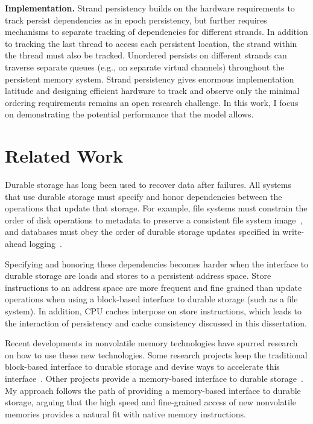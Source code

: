 \textbf{Implementation.}
Strand persistency builds on the hardware requirements to track persist dependencies as in epoch persistency, but further requires mechanisms to separate tracking of dependencies for different strands.
In addition to tracking the last thread to access each persistent location, the strand within the thread must also be tracked.
Unordered persists on different strands can traverse separate queues (e.g., on separate virtual channels) throughout the persistent memory system.
Strand persistency gives enormous implementation latitude and designing efficient hardware to track and observe only the minimal ordering requirements remains an open research challenge.
In this work, I focus on demonstrating the potential performance that the model allows.

\section{Related Work}
\label{sec:PersistencyModels:RelatedWork}

Durable storage has long been used to recover data after failures.
All systems that use durable storage must specify and honor dependencies between the operations that update that storage.
For example, file systems must constrain the order of disk operations to metadata to preserve a consistent file system image~\cite{Ganger00,Chidambaram13}, and databases must obey the order of durable storage updates specified in write-ahead logging~\cite{MohanHaderle92}.

Specifying and honoring these dependencies becomes harder when the interface to durable storage are loads and stores to a persistent address space.
Store instructions to an address space are more frequent and fine grained than update operations when using a block-based interface to durable storage (such as a file system).
In addition, CPU caches interpose on store instructions, which leads to the interaction of persistency and cache consistency discussed in this dissertation.

Recent developments in nonvolatile memory technologies have spurred research on how to use these new technologies.
Some research projects keep the traditional block-based interface to durable storage and devise ways to accelerate this interface~\cite{CaulfieldDe10}.
Other projects provide a memory-based interface to durable storage~\cite{CoburnCaulfield11}.
My approach follows the path of providing a memory-based interface to durable storage, arguing that the high speed and fine-grained access of new nonvolatile memories provides a natural fit with native memory instructions.

